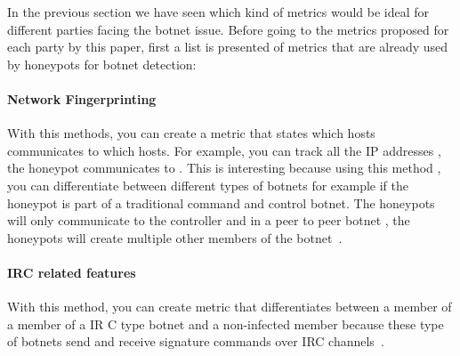 


In the previous section we have seen which kind of metrics would be ideal for different parties facing the botnet issue. Before going to the metrics proposed for each party by this paper, first a list is presented of metrics that are already used by honeypots for botnet detection:

\paragraph{Network Fingerprinting}
With this methods,  you can create a metric that states which hosts communicates to which hosts. For example, you can track all the IP addresses , the honeypot communicates to	. This is interesting because using this method , you can differentiate between different types of botnets for example if  the honeypot is part of a traditional command and control botnet. The honeypots will only communicate to the controller and  in a peer to peer botnet , the honeypots will create multiple other members of the botnet~\cite{GJ2007}.

\paragraph{IRC related features}
With this method, you can create metric that differentiates between a member of a member of a IR C type botnet and a non-infected member because these type of botnets  send and receive signature commands over IRC channels~\cite{AM2006}.

